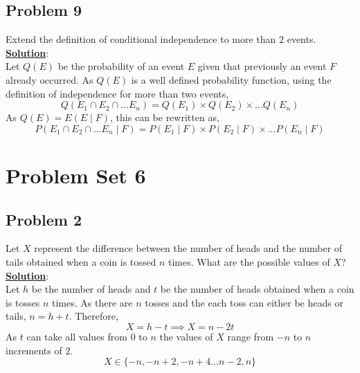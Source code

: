 \documentclass[11pt,letter paper]{report}
\begin{document}
\subsection*{Problem 9}
Extend the definition of conditional independence to more than $2$ events.\\[0.1cm]
{\bf \underline{Solution}}:\\
Let $Q(E)$ be the probability of an event $E$ given that previously an event $F$ already occurred. As $Q(E)$ is a well defined probability function, using the definition of independence for more than two events, 
$$Q(E_1\cap E_2\cap ...E_n)=Q(E_1)\times Q(E_2)\times ...Q(E_n)$$
As $Q(E)=E(E\mid F)$, this can be rewritten as, 
$$P(E_1\cap E_2\cap ...E_n\mid F)=P(E_1\mid F)\times P(E_2\mid F)\times ...P(E_n\mid F)$$

%
\section*{Problem Set 6}

\subsection*{Problem 2}
Let $X$ represent the difference between the number of heads and the number of tails obtained when a coin is tossed $n$ times. What are the possible values of $X$?\\[0.1cm]
{\bf \underline{Solution}}:\\
Let $h$ be the number of heads and $t$ be the number of heads obtained when a coin is tosses $n$ times. As there are $n$ tosses and the each toss can either be heads or tails, $n=h+t$. Therefore, 
$$X=h-t\implies X=n-2t$$
As $t$ can take all values from $0$ to $n$ the values of $X$ range from $-n$ to $n$ increments of $2$. 
$$X\in \lbrace-n,-n+2,-n+4...n-2,n\rbrace$$

\end{document}
